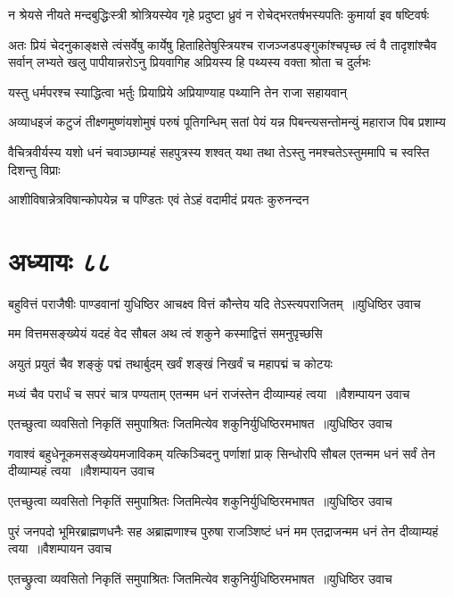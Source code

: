 \twolineshloka
{न श्रेयसे नीयते मन्दबुद्धिःस्त्री श्रोत्रियस्येव गृहे प्रदुष्टा}
{ध्रुवं न रोचेद्भरतर्षभस्यपतिः कुमार्या इव षष्टिवर्षः}


अतः प्रियं चेदनुकाङ्क्षसे त्वंसर्वेषु कार्येषु हिताहितेषुस्त्रियश्च राजञ्जडपङ्गुकांश्चपृच्छ त्वं वै तादृशांश्चैव सर्वान्
\twolineshloka
{लभ्यते खलु पापीयान्नरोऽनु प्रियवागिह}
{अप्रियस्य हि पथ्यस्य वक्ता श्रोता च दुर्लभः}


\twolineshloka
{यस्तु धर्मपरश्च स्याद्धित्वा भर्तुः प्रियाप्रिये}
{अप्रियाण्याह पथ्यानि तेन राजा सहायवान्}


\twolineshloka
{अव्याधइजं कटुजं तीक्ष्णमुष्णंयशोमुषं परुषं पूतिगन्धिम्}
{सतां पेयं यन्न पिबन्त्यसन्तोमन्युं महाराज पिब प्रशाम्य}


\twolineshloka
{वैचित्रवीर्यस्य यशो धनं चवाञ्छाम्यहं सहपुत्रस्य शश्वत्}
{यथा तथा तेऽस्तु नमश्चतेऽस्तुममापि च स्वस्ति दिशन्तु विप्राः}


\twolineshloka
{आशीविषान्नेत्रविषान्कोपयेन्न च पण्डितः}
{एवं तेऽहं वदामीदं प्रयतः कुरुनन्दन}


\chapter{अध्यायः ८८}
\twolineshloka
{बहुवित्तं पराजैषीः पाण्डवानां युधिष्ठिर}
{आचक्ष्व वित्तं कौन्तेय यदि तेऽस्त्यपराजितम् ॥युधिष्ठिर उवाच}


\twolineshloka
{मम वित्तमसङ्ख्येयं यदहं वेद सौबल}
{अथ त्वं शकुने कस्माद्वित्तं समनुपृच्छसि}


\twolineshloka
{अयुतं प्रयुतं चैव शङ्कुं पद्मं तथार्बुदम्}
{खर्वं शङ्खं निखर्वं च महापद्मं च कोटयः}


\twolineshloka
{मध्यं चैव परार्धं च सपरं चात्र पण्यताम्}
{एतन्मम धनं राजंस्तेन दीव्याम्यहं त्वया ॥वैशम्पायन उवाच}


\twolineshloka
{एतच्छुत्वा व्यवसितो निकृतिं समुपाश्रितः}
{जितमित्येव शकुनिर्युधिष्ठिरमभाषत ॥युधिष्ठिर उवाच}


\threelineshloka
{गवाश्वं बहुधेनूकमसङ्ख्येयमजाविकम्}
{यत्किञ्चिदनु पर्णाशां प्राक् सिन्धोरपि सौबल}
{एतन्मम धनं सर्वं तेन दीव्याम्यहं त्वया ॥वैशम्पायन उवाच}


\twolineshloka
{एतच्छुत्वा व्यवसितो निकृतिं समुपाश्रितः}
{जितमित्येव शकुनिर्युधिष्ठिरमभाषत ॥युधिष्ठिर उवाच}


\threelineshloka
{पुरं जनपदो भूमिरब्राह्मणधनैः सह}
{अब्राह्मणाश्च पुरुषा राजञ्शिष्टं धनं मम}
{एतद्राजन्मम धनं तेन दीव्याम्यहं त्वया ॥वैशम्पायन उवाच}


\twolineshloka
{एतच्छ्रुत्वा व्यवसितो निकृतिं समुपाश्रितः}
{जितमित्येव शकुनिर्युधिष्ठिरमभाषत ॥युधिष्ठिर उवाच}


